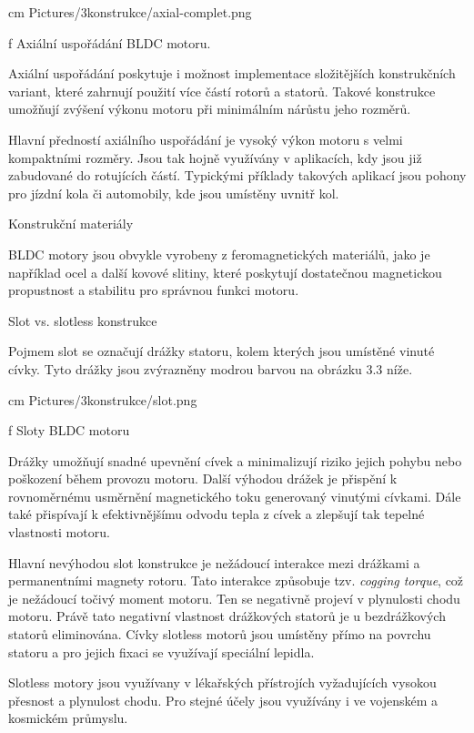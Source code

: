  \medskip
  cm \cinspic Pictures/3konstrukce/axial-complet.png 
 \caption/f Axiální uspořádání BLDC motoru.
 \medskip

Axiální uspořádání poskytuje i možnost implementace složitějších konstrukčních variant, které zahrnují
použití více částí rotorů a statorů. Takové konstrukce umožňují zvýšení výkonu motoru při minimálním nárůstu jeho rozměrů.

Hlavní předností axiálního uspořádání je vysoký výkon motoru s velmi kompaktními rozměry. Jsou tak hojně 
využívány v aplikacích, kdy jsou již zabudované do rotujících částí. Typickými příklady takových aplikací jsou 
pohony pro jízdní kola či automobily, kde jsou umístěny uvnitř kol. 

\secc Konstrukční materiály

BLDC motory jsou obvykle vyrobeny z feromagnetických materiálů, jako je 
například ocel a další kovové slitiny, které poskytují dostatečnou magnetickou propustnost a stabilitu 
pro správnou funkci motoru.

 \secc Slot vs. slotless konstrukce

 Pojmem slot se označují drážky statoru, kolem kterých jsou umístěné vinuté cívky. Tyto drážky jsou zvýrazněny modrou barvou
 na obrázku 3.3 níže.

 \medskip
  cm \cinspic Pictures/3konstrukce/slot.png 
 \caption/f Sloty BLDC motoru
 \medskip

 Drážky umožňují snadné upevnění cívek a minimalizují riziko jejich pohybu nebo poškození během provozu motoru. 
 Další výhodou drážek je přispění k rovnoměrnému usměrnění magnetického toku generovaný vinutými cívkami.
 Dále také přispívají k efektivnějšímu odvodu tepla z cívek a zlepšují tak tepelné vlastnosti motoru.

 Hlavní nevýhodou slot konstrukce je nežádoucí interakce mezi drážkami a permanentními magnety rotoru. 
 Tato interakce způsobuje tzv. {\em cogging torque}, což je nežádoucí točivý moment motoru. %
 Ten se negativně projeví v plynulosti chodu motoru. Právě tato negativní vlastnost drážkových statorů je u bezdrážkových statorů eliminována.
  Cívky slotless motorů jsou umístěny přímo na povrchu statoru a pro jejich fixaci se využívají
 speciální lepidla. %

 Slotless motory jsou využívany v lékařských přístrojích vyžadujících vysokou přesnost a plynulost chodu. Pro stejné účely jsou 
 využívány i ve vojenském a kosmickém průmyslu.

